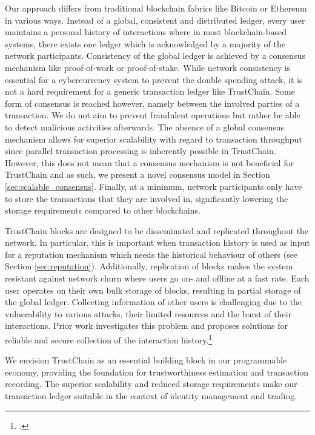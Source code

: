 \documentclass[USenglish]{article}
\begin{document}
Our approach differs from traditional blockchain fabrics like Bitcoin or Ethereum in various ways.
Instead of a global, consistent and distributed ledger, every user maintains a personal history of interactions where in most blockchain-based systems, there exists one ledger which is acknowledged by a majority of the network participants.
Consistency of the global ledger is achieved by a consensus mechanism like proof-of-work or proof-of-stake.
While network consistency is essential for a cybercurrency system to prevent the double spending attack, it is not a hard requirement for a generic transaction ledger like TrustChain.
Some form of consensus is reached however, namely between the involved parties of a transaction.
We do not aim to prevent fraudulent operations but rather be able to detect malicious activities afterwards.
The absence of a global consensus mechanism allows for superior scalability with regard to transaction throughput since parallel transaction processing is inherently possible in TrustChain.
However, this does not mean that a consensus mechanism is not beneficial for TrustChain and as such, we present a novel consensus model in Section \ref{sec:scalable_consensus}.
Finally, at a minimum, network participants only have to store the transactions that they are involved in, significantly lowering the storage requirements compared to other blockchains.

TrustChain blocks are designed to be disseminated and replicated throughout the network.
In particular, this is important when transaction history is used as input for a reputation mechanism which needs the historical behaviour of others (see Section \ref{sec:reputation}).
Additionally, replication of blocks makes the system resistant against network churn where users go on- and offline at a fast rate.
Each user operates on their own bulk storage of blocks, resulting in partial storage of the global ledger.
Collecting information of other users is challenging due to the vulnerability to various attacks, their limited resources and the burst of their interactions.
Prior work investigates this problem and proposes solutions for reliable and secure collection of the interaction history.\footcite{gkoroureducing}

We envision TrustChain as an essential building block in our programmable economy, providing the foundation for trustworthiness estimation and transaction recording.
The superior scalability and reduced storage requirements make our transaction ledger suitable in the context of identity management and trading.
\end{document}
